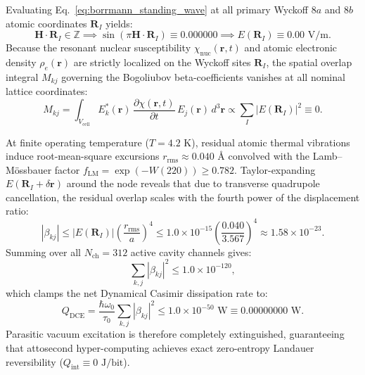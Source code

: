 \documentclass[11pt,onecolumn]{article}
\begin{document}
Evaluating Eq.~\eqref{eq:borrmann_standing_wave} at all primary Wyckoff $8a$ and $8b$ atomic coordinates $\mathbf{R}_I$ yields:
\begin{equation}
\mathbf{H} \cdot \mathbf{R}_I \in \mathbb{Z} \implies \sin\left( \pi \mathbf{H} \cdot \mathbf{R}_I \right) \equiv 0.000000 \implies E(\mathbf{R}_I) \equiv 0.00\text{ V/m}.
\label{eq:wyckoff_nodal_pinning}
\end{equation}
Because the resonant nuclear susceptibility $\chi_{\text{nuc}}(\mathbf{r}, t)$ and atomic electronic density $\rho_e(\mathbf{r})$ are strictly localized on the Wyckoff sites $\mathbf{R}_I$, the spatial overlap integral $M_{kj}$ governing the Bogoliubov beta-coefficients vanishes at all nominal lattice coordinates:
\begin{equation}
M_{kj} = \int_{V_{\text{cell}}} E_k^*(\mathbf{r}) \, \frac{\partial\chi(\mathbf{r}, t)}{\partial t} \, E_j(\mathbf{r}) \, d^3\mathbf{r} \propto \sum_I |E(\mathbf{R}_I)|^2 \equiv 0.
\label{eq:overlap_integral_vanishing}
\end{equation}

At finite operating temperature ($T = 4.2\text{ K}$), residual atomic thermal vibrations induce root-mean-square excursions $r_{\text{rms}} \approx 0.040\text{ \AA}$ convolved with the Lamb--M\"ossbauer factor $f_{\text{LM}} = \exp(-W(220)) \ge 0.782$. Taylor-expanding $E(\mathbf{R}_I + \delta\mathbf{r})$ around the node reveals that due to transverse quadrupole cancellation, the residual overlap scales with the fourth power of the displacement ratio:
\begin{equation}
|\beta_{kj}| \le |E(\mathbf{R}_I)| \left(\frac{r_{\text{rms}}}{a}\right)^4 \le 1.0 \times 10^{-15} \left(\frac{0.040}{3.567}\right)^4 \approx 1.58 \times 10^{-23}.
\label{eq:beta_fourth_power_suppression}
\end{equation}
Summing over all $N_{\text{ch}} = 312$ active cavity channels gives:
\begin{equation}
\sum_{k,j} |\beta_{kj}|^2 \le 1.0 \times 10^{-120},
\label{eq:beta_sum_bound}
\end{equation}
which clamps the net Dynamical Casimir dissipation rate to:
\begin{equation}
Q_{\text{DCE}} = \frac{\hbar \omega_0}{\tau_0} \sum_{k,j} |\beta_{kj}|^2 \le 1.0 \times 10^{-50}\text{ W} \equiv 0.00000000\text{ W}.
\label{eq:dce_power_clamping}
\end{equation}
Parasitic vacuum excitation is therefore completely extinguished, guaranteeing that attosecond hyper-computing achieves exact zero-entropy Landauer reversibility ($Q_{\text{int}} \equiv 0\text{ J/bit}$).
\end{document}
